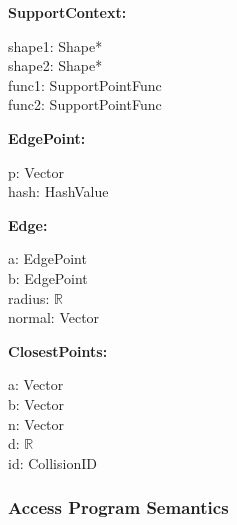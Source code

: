 \documentclass[12pt]{article}
\newcommand{\R}{$\mathbb{R}$}
\begin{document}
\noindent \textbf{SupportContext:} 
\begin{multicols}{2}
	\noindent shape1: Shape* \\
	shape2: Shape* \\
	func1: SupportPointFunc \\
	func2: SupportPointFunc
\end{multicols}

\noindent \textbf{EdgePoint:} 
\begin{multicols}{2}
	\noindent p: Vector \\
	hash: HashValue
\end{multicols}

\noindent \textbf{Edge:} 
\begin{multicols}{2}
	\noindent a: EdgePoint \\
	b: EdgePoint \\
	radius: \R \\
	normal: Vector
\end{multicols}

\pagebreak %

\noindent \textbf{ClosestPoints:} 
\begin{multicols}{3}
	\noindent a: Vector \\
	b: Vector \\
	n: Vector \\
	d: \R \\
	id: CollisionID
\end{multicols}



\subsubsection{Access Program Semantics} \label{SecAPSCollision}
\end{document}
